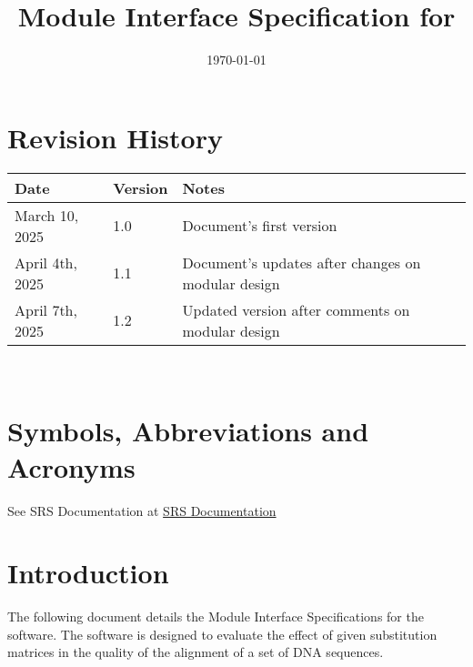 \documentclass[12pt, titlepage]{article}
\begin{document}
\title{Module Interface Specification for \progname{}}

\author{\authname}

\date{\today}

\maketitle


\section{Revision History}

\begin{tabularx}{\textwidth}{p{3cm}p{2cm}X}
\toprule {\bf Date} & {\bf Version} & {\bf Notes}\\
\midrule
March 10, 2025 & 1.0 & Document's first version\\
April 4th, 2025 & 1.1 & Document's updates after changes on modular design\\
April 7th, 2025 & 1.2 & Updated version after comments on modular design\\
\bottomrule
\end{tabularx}

~\newpage

\section{Symbols, Abbreviations and Acronyms}
See SRS Documentation at \href{https://github.com/UGarCil/UGarcil_capstone/blob/main/docs/SRS/SRS.pdf}{SRS Documentation}


\newpage

\tableofcontents

\newpage


\section{Introduction}

The following document details the Module Interface Specifications for
the \progname software. The software is designed to evaluate the effect of 
given substitution matrices in the quality of the alignment of a set of DNA sequences.
\end{document}
